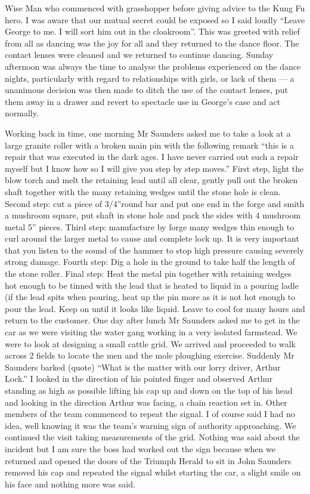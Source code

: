 Wise Man who commenced with grasshopper before giving advice to the Kung Fu
hero. I was aware that our mutual secret could be exposed so I said loudly
``Leave George to me. I will sort him out in the cloakroom''. This was greeted
with relief from all as dancing was the joy for all and they returned to the
dance floor. The contact lenses were cleaned and we returned to continue
dancing. Sunday afternoon was always the time to analyse the problems
experienced on the dance nights, particularly with regard to relationships with
girls, or lack of them --- a unanimous decision was then made to ditch the use
of the contact lenses, put them away in a drawer and revert to spectacle use in
George's case and act normally.

Working back in time, one morning Mr Saunders asked me to take a look at a large
granite roller with a broken main pin with the following remark ``this is a
repair that was executed in the dark ages. I have never carried out such a
repair myself but I know how so I will give you step by step moves.'' First
step, light the blow torch and melt the retaining lead until all clear, gently
pull out the broken shaft together with the many retaining wedges until the
stone hole is clean. Second step: cut a piece of 3/4''round bar and put one end
in the forge and smith a mushroom square, put shaft in stone hole and pack the
sides with 4 mushroom metal 5'' pieces. Third step: manufacture by forge many
wedges thin enough to curl around the larger metal to cause and complete lock
up. It is very important that you listen to the sound of the hammer to stop
high pressure causing severely strong damage. Fourth step: Dig a hole in the
ground to take half the length of the stone roller. Final step: Heat the metal
pin together with retaining wedges hot enough to be tinned with the lead that
is heated to liquid in a pouring ladle (if the lead spits when pouring, heat up
the pin more as it is not hot enough to pour the lead. Keep on until it looks
like liquid. Leave to cool for many hours and return to the customer.
One day after lunch Mr Saunders asked me to get in the car as we were visiting
the water gang working in a very isolated farmstead. We were to look at
designing a small cattle grid. We arrived and proceeded to walk across 2 fields
to locate the men and the mole ploughing exercise. Suddenly Mr Saunders barked
(quote) ``What is the matter with our lorry driver, Arthur Lock.'' I looked in
the direction of his pointed finger and observed Arthur standing as high as
possible lifting his cap up and down on the top of his head and looking in the
direction Arthur was facing, a chain reaction set in. Other members of the team
commenced to repeat the signal. I of course said I had no idea, well knowing it
was the team's warning sign of authority approaching. We continued the visit
taking measurements of the grid. Nothing was said about the incident but I am
sure the boss had worked out the sign because when we returned and opened the
doors of the Triumph Herald to sit in John Saunders removed his cap and
repeated the signal whilst starting the car, a slight smile on his face and
nothing more was said.
